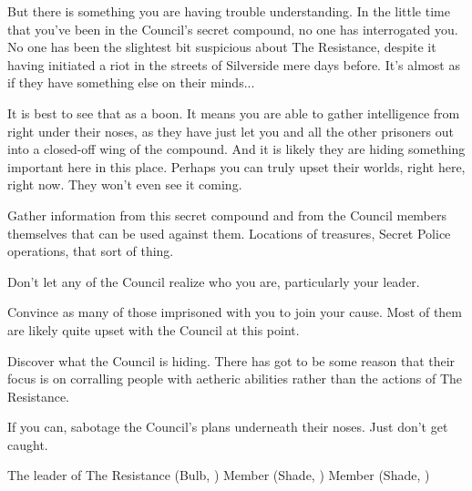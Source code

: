 \documentclass[blue]{Silversiders}
\begin{document}
But there is something you are having trouble understanding. In the little time that you've been in the Council's secret compound, no one has interrogated you. No one has been the slightest bit suspicious about The Resistance, despite it having initiated a riot in the streets of Silverside mere days before. It's almost as if they have something else on their minds...

It is best to see that as a boon. It means you are able to gather intelligence from right under their noses, as they have just let you and all the other prisoners out into a closed-off wing of the compound. And it is likely they are hiding something important here in this place. Perhaps you can truly upset their worlds, right here, right now. They won't even see it coming.

\begin{itemz}[Goals]
	\item Gather information from this secret compound and from the Council members themselves that can be used against them. Locations of treasures, Secret Police operations, that sort of thing.
	\item Don't let any of the Council realize who you are, particularly your leader.
	\item Convince as many of those imprisoned with you to join your cause. Most of them are likely quite upset with the Council at this point.
	\item Discover what the Council is hiding. There has got to be some reason that their focus is on corralling people with aetheric abilities rather than the actions of The Resistance.
	\item If you can, sabotage the Council's plans underneath their noses. Just don't get caught.
\end{itemz}

\begin{members}
	\member{\cIngenuity{}} The leader of The Resistance (Bulb, \cIngenuity{\Sex})
	\member{\cCaregiver{}} Member (Shade, \cCaregiver{\Sex})
	\member{\cLove{}} Member (Shade, \cLove{\Sex})
	
\end{members}
\end{document}
